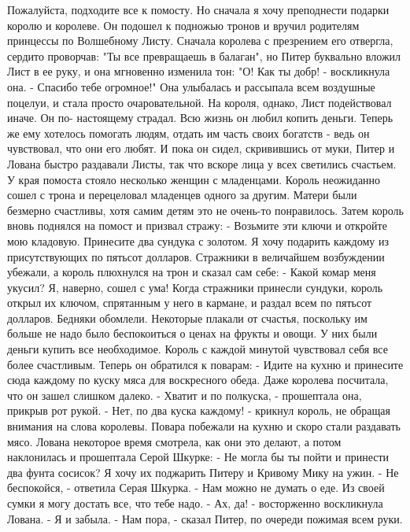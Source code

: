 Пожалуйста, подходите все к помосту. Но сначала я хочу преподнести 
подарки королю и королеве.
    Он подошел к подножью тронов и вручил родителям принцессы по 
Волшебному Листу. Сначала королева с презрением его отвергла, сердито 
проворчав: "Ты все превращаешь в балаган", но Питер буквально вложил 
Лист в ее руку, и она мгновенно изменила тон: "О! Как ты добр! - 
воскликнула она. - Спасибо тебе огромное!"
    Она улыбалась и рассыпала всем воздушные поцелуи, и стала просто 
очаровательной. На короля, однако, Лист подействовал иначе. Он по-
настоящему страдал. Всю жизнь он любил копить деньги. Теперь же ему 
хотелось помогать людям, отдать им часть своих богатств - ведь он 
чувствовал, что они его любят. И пока он сидел, скривившись от муки, 
Питер и Лована быстро раздавали Листы, так что вскоре лица у всех 
светились счастьем.
    У края помоста стояло несколько женщин с младенцами. Король 
неожиданно сошел с трона и перецеловал младенцев одного за другим. 
Матери были безмерно счастливы, хотя самим детям это не очень-то 
понравилось.
    Затем король вновь поднялся на помост и призвал стражу:
    - Возьмите эти ключи и откройте мою кладовую. Принесите два 
сундука с золотом. Я хочу подарить каждому из присутствующих по 
пятьсот долларов.
    Стражники в величайшем возбуждении убежали, а король плюхнулся на 
трон и сказал сам себе:
    - Какой комар меня укусил? Я, наверно, сошел с ума!
    Когда стражники принесли сундуки, король открыл их ключом, 
спрятанным у него в кармане, и раздал всем по пятьсот долларов.
    Бедняки обомлели. Некоторые плакали от счастья, поскольку им 
больше не надо было беспокоиться о ценах на фрукты и овощи. У них были 
деньги купить все необходимое.
    Король с каждой минутой чувствовал себя все более счастливым. 
Теперь он обратился к поварам:
    - Идите на кухню и принесите сюда каждому по куску мяса для 
воскресного обеда.
    Даже королева посчитала, что он зашел слишком далеко.
    - Хватит и по полкуска, - прошептала она, прикрыв рот рукой.
    - Нет, по два куска каждому! - крикнул король, не обращая внимания 
на слова королевы. Повара побежали на кухню и скоро стали раздавать 
мясо.
    Лована некоторое время смотрела, как они это делают, а потом 
наклонилась и прошептала Серой Шкурке:
    - Не могла бы ты пойти и принести два фунта сосисок? Я хочу их 
поджарить Питеру и Кривому Мику на ужин.
    - Не беспокойся, - ответила Серая Шкурка. - Нам можно не думать о 
еде. Из своей сумки я могу достать все, что тебе надо.
    - Ах, да! - восторженно воскликнула Лована. - Я и забыла.
    - Нам пора, - сказал Питер, по очереди пожимая всем руки.
